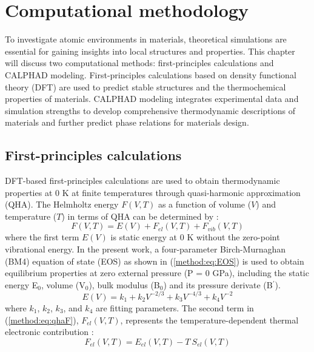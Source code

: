 \chapter{Computational methodology} \label{chap:method}
To investigate atomic environments in materials, theoretical simulations are essential for gaining insights into local structures and properties. This chapter will discuss two computational methods: first-principles calculations and CALPHAD modeling. First-principles calculations based on density functional theory (DFT) are used to predict stable structures and the thermochemical properties of materials. CALPHAD modeling integrates experimental data and simulation strengths to develop comprehensive thermodynamic descriptions of materials and further predict phase relations for materials design.

\section{First-principles calculations} \label{method:sec:firstprinciples}
DFT-based first-principles calculations are used to obtain thermodynamic properties at 0 K at finite temperatures through quasi-harmonic approximation (QHA). The Helmholtz energy $F(V,T)$ as a function of volume ($V$) and temperature ($T$) in terms of QHA can be determined by \cite{shang2010first}:
\begin{equation} \label{method:eq:qhaF}
    F\left(V,T\right)=E\left(V\right)+F_{el}\left(V,T\right)+F_{vib}(V,T)
\end{equation}
where the first term $E\left(V\right)$ is static energy at 0 K without the zero-point vibrational energy. In the present work, a four-parameter Birch-Murnaghan (BM4) equation of state (EOS) \cite{shang2010first} as shown in (\ref{method:eq:EOS}) is used to obtain equilibrium properties at zero external pressure (P = 0 GPa), including the static energy E$_0$, volume (V$_0$), bulk modulus (B$_0$) and its pressure derivate (B$^\prime$).
\begin{equation} \label{method:eq:EOS}
    E\left(V\right)=k_1+k_2V^{-2/3}+k_3V^{-4/3}+k_4V^{-2}
\end{equation}
where $k_1$, $k_2$, $k_3$, and $k_4$ are fitting parameters. The second term in (\ref{method:eq:qhaF}), $F_{el}\left(V,T\right)$, represents the temperature-dependent thermal electronic contribution \cite{wang2004thermodynamic}:
\begin{equation} \label{method:eq:Fel}
    F_{el}(V,T)=E_{el}(V,T)-T\:S_{el}(V,T)
\end{equation}
